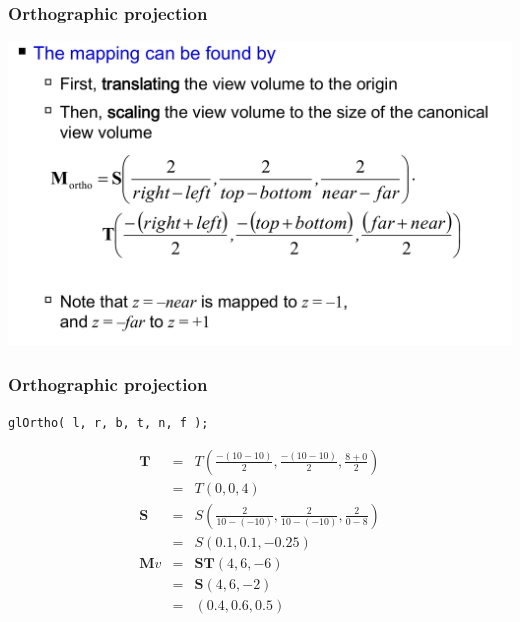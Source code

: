 \documentclass{beamer}
\begin{document}
\begin{frame}
    \frametitle{Orthographic projection}

    \begin{center}
        \includegraphics[scale=0.3]{ortho-proj.png}
    \end{center}

\end{frame}

\begin{frame}
    \frametitle{Orthographic projection}

    \begin{tcolorbox}[colback=violet!5!white]
        \begin{center}
            \texttt{glOrtho( l, r, b, t, n, f );}
        \end{center}
    \end{tcolorbox}

    \begin{eqnarray*}
        \mathbf{T} &=& T(\frac{-(10-10)}{2} , \frac{-(10-10)}{2} , \frac{8+0}{2})\\
        &=& T(0,0,4)\\
        \mathbf{S} &=& S(\frac{2}{10 - (-10)} ,\frac{2}{10 - (-10)}, \frac{2}{0 - 8} )\\
        &=& S(0.1,0.1,-0.25)\\
        \mathbf{M}v &=& \mathbf{ST} (4,6,-6)\\
        &=& \mathbf{S} (4,6,-2)\\
        &=& (0.4,0.6,0.5)\\
    \end{eqnarray*}

\end{frame}
\end{document}
